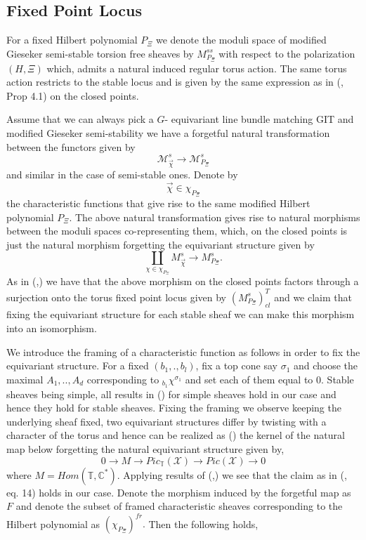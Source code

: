 \documentclass[10pt]{amsart}
\newcommand{\sX}{{\mathcal X}}
\numberwithin{equation}{subsection}
\begin{document}
\subsection{Fixed Point Locus}
For a fixed Hilbert polynomial $P_{\Xi}$ we denote the moduli space of modified Gieseker semi-stable torsion free sheaves by $M^{ss}_{P_{\Xi}}$ with respect to the polarization $(H,\Xi)$ which, admits a natural induced regular torus action. The same torus action restricts to the stable locus and is given by the same expression as in (\cite{Koo2}, Prop 4.1) on the closed points.\par
Assume that we can always pick a $G$- equivariant line bundle matching GIT and modified Gieseker semi-stability we have a forgetful natural transformation between the functors given by
$$\mathscr{M}^{s}_{\vec\chi} \to \mathscr{M}^{s}_{P_{\Xi}}$$ and similar in the case of semi-stable ones.
Denote by $$\vec\chi\in \chi_{P_{\Xi}}$$ the characteristic functions that give rise to the same modified Hilbert polynomial $P_{\Xi}.$
The above natural transformation gives rise to natural morphisms between the moduli spaces co-representing them, which, on the closed points is just the natural morphism forgetting the equivariant structure given by
$$\coprod\limits_{\chi\in\chi_{P_{\Xi}}}M^{s}_{\vec\chi}\to M^{s}_{P_{\Xi}}.$$ 
As in (\cite{Koo1},\cite{Koo2}) we have that the above morphism on the closed points factors through a surjection onto the torus fixed point locus given by $(M^{s}_{P_{\Xi}})^{T}_{cl}$ and we claim that fixing the equivariant structure for each stable sheaf we can make this morphism into an isomorphism.\par
We introduce the framing of a characteristic function as follows in order to fix the equivariant structure. For a fixed $(b_1,.,b_l)$, fix a top cone say $\sigma_1$ and choose the maximal $A_1,..,A_{d}$ corresponding to $_{b_1}\chi^{\sigma_{1}}$ and set each of them equal to $0.$ Stable sheaves being simple, all results in (\cite{Koo2}) for simple sheaves hold in our case and hence they hold for stable sheaves. Fixing the framing we observe keeping the underlying sheaf fixed, two equivariant structures differ by twisting with a character of the torus and hence can be realized as (\cite{FLT}) the kernel of the natural map below  
forgetting the natural equivariant structure given by,
\begin{equation}\label{ex}
0\to M\to Pic_{\mathbb T}(\sX) \to Pic({\sX}) \to 0     
\end{equation} where $M=Hom(\mathbb T, \mathbb C^{*}).$ Applying results of (\cite{JT},\cite{YJ1}) we see that the claim as in (\cite{Koo2}, eq. 14) holds in our case. Denote the morphism induced by the forgetful map as $F$ and denote the subset of framed characteristic sheaves corresponding to the Hilbert polynomial as $(\chi_{P_{\Xi}})^{fr}.$ Then the following holds,
\end{document}
